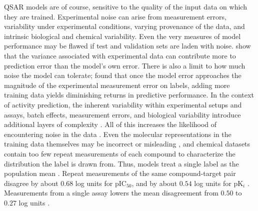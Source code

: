 QSAR models are of course, sensitive to the quality of the input data on which they are trained. Experimental noise can arise from measurement errors, variability under experimental conditions, varying provenance of the data, and intrinsic biological and chemical variability. Even the very measures of model performance may be flawed if test and validation sets are laden with noise. \citet{Kolmar2021} show that the variance associated with experimental data can contribute more to prediction error than the model’s own error. There is also a limit to how much noise the model can tolerate; \citet{jorner2021} found that once the model error approaches the magnitude of the experimental measurement error on labels, adding more training data yields diminishing returns in predictive performance. In the context of activity prediction, the inherent variability within experimental setups and assays, batch effects, measurement errors, and biological variability introduce additional layers of complexity \citep{Kolmar2021, Fourches2010}. All of this increases the likelihood of encountering noise in the data \citep{Fang2022}. Even the molecular representations in the training data themselves may be incorrect or misleading \citep{Walters2023}, and chemical datasets contain too few repeat measurements of each compound to characterize the distribution the label is drawn from. Thus, models treat a single label as the population mean \citep{Kolmar2021}. Repeat measurements of the same compound-target pair disagree by about $0.68$ log units for pIC$_{50}$, and by about $0.54$ log units for pK$_i$ \citep{Kalliokoski2013, Kramer2012}. Measurements from a single assay lowers the mean disagreement from $0.50$ to $0.27$ log units \citep{landrum2024}.  



